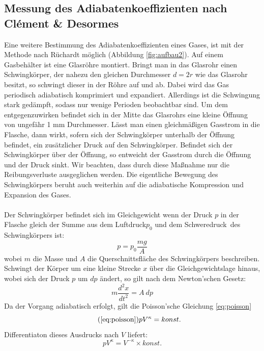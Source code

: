\documentclass[a4paper,10pt]{article}
\begin{document}
\subsection{ Messung des Adiabatenkoeffizienten nach Clément \& Desormes}
Eine weitere Bestimmung des Adiabatenkoeffizienten eines Gases, ist mit der Methode nach Rüchardt möglich (Abbildung \ref{fig:aufbau2}). Auf einem Gasbehälter ist eine Glasröhre montiert. Bringt man in das Glasrohr einen Schwingkörper, der nahezu den gleichen Durchmesser \(d =2r\) wie das Glasrohr besitzt, so schwingt
dieser in der Röhre auf und ab. Dabei wird das Gas periodisch adiabatisch komprimiert und expandiert. Allerdings ist die Schwingung stark gedämpft, sodass nur wenige Perioden beobachtbar sind. Um dem entgegenzuwirken befindet sich in der Mitte das Glasrohrs eine kleine Öffnung von ungefähr 1 mm Durchmesser. Lässt man einen gleichmäßigen Gasstrom in die Flasche, dann wirkt, sofern sich der Schwingkörper unterhalb der Öffnung befindet, ein zusätzlicher Druck auf den Schwingkörper. Befindet sich der Schwingkörper über der Öffnung, so entweicht der Gasstrom durch die Öffnung und der Druck sinkt. Wir beachten, dass durch diese Maßnahme nur die Reibungsverluste ausgeglichen werden. Die eigentliche Bewegung des Schwingkörpers beruht auch weiterhin auf die adiabatische Kompression und
Expansion des Gases.\\\\
Der Schwingkörper befindet sich im Gleichgewicht wenn der Druck \(p\) in der
Flasche gleich der Summe aus dem Luftdruck\(p_0\) und dem \glqq Schweredruck\grqq~des
Schwingkörpers ist:
\begin{equation}
  p=p_0 \frac{mg}{A}
\end{equation}
wobei \(m\) die Masse und \(A\) die Querschnittsfläche des Schwingkörpers beschreiben. Schwingt der Körper um eine kleine Strecke \(x\) über die Gleichgewichtslage hinaus, wobei sich der Druck \(p\) um \(dp\) ändert, so gilt nach dem Newton'schen Gesetz:
\begin{equation} \label{eq:gl14}
 m \frac{{d^2}x}{{dt}^2}=A\:{dp}
\end{equation}
Da der Vorgang adiabatisch erfolgt, gilt die Poisson'sche Gleichung \eqref{eq:poisson}
\begin{equation}\tag{\ref{eq:poisson}}
p V^{\kappa} = konst.
\end{equation}
Differentiaton dieses Ausdrucks nach \(V\)  liefert:
\begin{equation}
p V^{\kappa} = V^{- \kappa} \times konst.
\end{equation}
\end{document}
